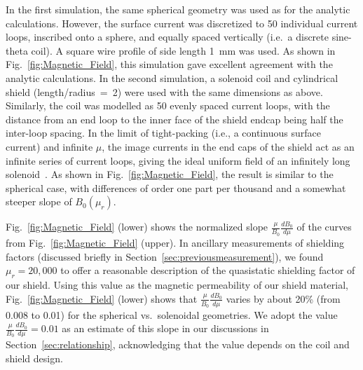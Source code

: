 In the first simulation, the same spherical geometry was used as for
the analytic calculations.  However, the surface current was
discretized to 50 individual current loops, inscribed onto a sphere,
and equally spaced vertically (i.e.~a discrete sine-theta coil). A
square wire profile of side length 1~mm was used. As shown in
Fig.~\ref{fig:Magnetic_Field}, this simulation gave excellent
agreement with the analytic calculations.  In the second simulation, a
solenoid coil and cylindrical shield (length/radius~=~2) were used
with the same dimensions as above.  Similarly, the coil was modelled
as 50 evenly spaced current loops, with the distance from an end loop
to the inner face of the shield endcap being half the inter-loop
spacing.  In the limit of tight-packing (i.e., a continuous surface
current) and infinite $\mu$, the image currents in the end caps of the
shield act as an infinite series of current loops, giving the ideal
uniform field of an infinitely long
solenoid~\cite{lambert1975magnetically,sumner1987calculation}. As shown in
Fig.~\ref{fig:Magnetic_Field}, the result is similar to the spherical
case, with differences of order one part per thousand and a somewhat
steeper slope of $B_0(\mu_r)$.

Fig.~\ref{fig:Magnetic_Field} (lower) shows the normalized slope
$\frac{\mu}{B_0}\frac{dB_0}{d\mu}$ of the curves from
Fig.~\ref{fig:Magnetic_Field} (upper).  In ancillary measurements of
shielding factors (discussed briefly in
Section~\ref{sec:previousmeasurement}), we found $\mu_r=20,000$ to
offer a reasonable description of the quasistatic shielding factor of
our shield.  Using this value as the magnetic permeability of our
shield material, Fig.~\ref{fig:Magnetic_Field} (lower) shows that
$\frac{\mu}{B_0}\frac{dB_0}{d\mu}$ varies by about 20\% (from 0.008 to
0.01) for the spherical vs.~solenoidal geometries.  We adopt the value
$\frac{\mu}{B_0}\frac{dB_0}{d\mu}=0.01$ as an estimate of this slope
in our discussions in Section~\ref{sec:relationship}, acknowledging
that the value depends on the coil and shield design.

